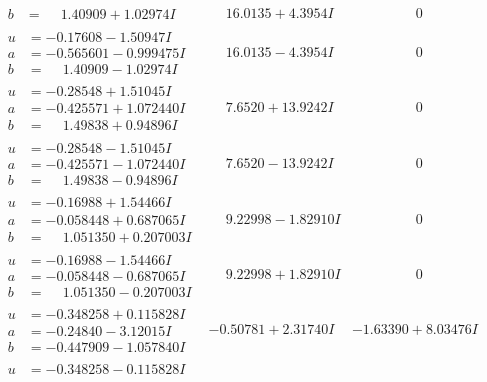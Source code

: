 \documentclass[1p]{elsarticle_modified}
\theoremstyle{definition}
\begin{document}
$$\begin{array}{c|c|c}
\begin{aligned}
b &= \phantom{-}1.40909 + 1.02974 I\end{aligned}
 & \phantom{-}16.0135 + 4.3954 I & \phantom{-0.000000 } 0 \\ \hline\begin{aligned}
u &= -0.17608 - 1.50947 I \\
a &= -0.565601 - 0.999475 I \\
b &= \phantom{-}1.40909 - 1.02974 I\end{aligned}
 & \phantom{-}16.0135 - 4.3954 I & \phantom{-0.000000 } 0 \\ \hline\begin{aligned}
u &= -0.28548 + 1.51045 I \\
a &= -0.425571 + 1.072440 I \\
b &= \phantom{-}1.49838 + 0.94896 I\end{aligned}
 & \phantom{-}7.6520 + 13.9242 I & \phantom{-0.000000 } 0 \\ \hline\begin{aligned}
u &= -0.28548 - 1.51045 I \\
a &= -0.425571 - 1.072440 I \\
b &= \phantom{-}1.49838 - 0.94896 I\end{aligned}
 & \phantom{-}7.6520 - 13.9242 I & \phantom{-0.000000 } 0 \\ \hline\begin{aligned}
u &= -0.16988 + 1.54466 I \\
a &= -0.058448 + 0.687065 I \\
b &= \phantom{-}1.051350 + 0.207003 I\end{aligned}
 & \phantom{-}9.22998 - 1.82910 I & \phantom{-0.000000 } 0 \\ \hline\begin{aligned}
u &= -0.16988 - 1.54466 I \\
a &= -0.058448 - 0.687065 I \\
b &= \phantom{-}1.051350 - 0.207003 I\end{aligned}
 & \phantom{-}9.22998 + 1.82910 I & \phantom{-0.000000 } 0 \\ \hline\begin{aligned}
u &= -0.348258 + 0.115828 I \\
a &= -0.24840 - 3.12015 I \\
b &= -0.447909 - 1.057840 I\end{aligned}
 & -0.50781 + 2.31740 I & -1.63390 + 8.03476 I \\ \hline\begin{aligned}
u &= -0.348258 - 0.115828 I \\

\end{aligned}
\end{array}$$
\end{document}
